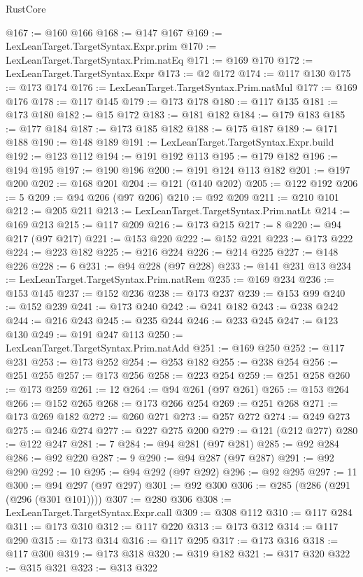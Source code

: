 \begin{lexlean}{RustCore}
\begin{coremodule}
@167 := @160 @166
@168 := @147 @167
@169 := LexLeanTarget.TargetSyntax.Expr.prim
@170 := LexLeanTarget.TargetSyntax.Prim.natEq
@171 := @169 @170
@172 := LexLeanTarget.TargetSyntax.Expr
@173 := @2 @172
@174 := @117 @130
@175 := @173 @174
@176 := LexLeanTarget.TargetSyntax.Prim.natMul
@177 := @169 @176
@178 := @117 @145
@179 := @173 @178
@180 := @117 @135
@181 := @173 @180
@182 := @15 @172
@183 := @181 @182
@184 := @179 @183
@185 := @177 @184
@187 := @173 @185 @182
@188 := @175 @187
@189 := @171 @188
@190 := @148 @189
@191 := LexLeanTarget.TargetSyntax.Expr.build
@192 := @123 @112
@194 := @191 @192 @113
@195 := @179 @182
@196 := @194 @195
@197 := @190 @196
@200 := @191 @124 @113 @182
@201 := @197 @200
@202 := @168 @201
@204 := @121 (@140 @202)
@205 := @122 @192
@206 := 5
@209 := @94 @206 (@97 @206)
@210 := @92 @209
@211 := @210 @101
@212 := @205 @211
@213 := LexLeanTarget.TargetSyntax.Prim.natLt
@214 := @169 @213
@215 := @117 @209
@216 := @173 @215
@217 := 8
@220 := @94 @217 (@97 @217)
@221 := @153 @220
@222 := @152 @221
@223 := @173 @222
@224 := @223 @182
@225 := @216 @224
@226 := @214 @225
@227 := @148 @226
@228 := 6
@231 := @94 @228 (@97 @228)
@233 := @141 @231 @13
@234 := LexLeanTarget.TargetSyntax.Prim.natRem
@235 := @169 @234
@236 := @153 @145
@237 := @152 @236
@238 := @173 @237
@239 := @153 @99
@240 := @152 @239
@241 := @173 @240
@242 := @241 @182
@243 := @238 @242
@244 := @216 @243
@245 := @235 @244
@246 := @233 @245
@247 := @123 @130
@249 := @191 @247 @113
@250 := LexLeanTarget.TargetSyntax.Prim.natAdd
@251 := @169 @250
@252 := @117 @231
@253 := @173 @252
@254 := @253 @182
@255 := @238 @254
@256 := @251 @255
@257 := @173 @256
@258 := @223 @254
@259 := @251 @258
@260 := @173 @259
@261 := 12
@264 := @94 @261 (@97 @261)
@265 := @153 @264
@266 := @152 @265
@268 := @173 @266 @254
@269 := @251 @268
@271 := @173 @269 @182
@272 := @260 @271
@273 := @257 @272
@274 := @249 @273
@275 := @246 @274
@277 := @227 @275 @200
@279 := @121 (@212 @277)
@280 := @122 @247
@281 := 7
@284 := @94 @281 (@97 @281)
@285 := @92 @284
@286 := @92 @220
@287 := 9
@290 := @94 @287 (@97 @287)
@291 := @92 @290
@292 := 10
@295 := @94 @292 (@97 @292)
@296 := @92 @295
@297 := 11
@300 := @94 @297 (@97 @297)
@301 := @92 @300
@306 := @285 (@286 (@291 (@296 (@301 @101))))
@307 := @280 @306
@308 := LexLeanTarget.TargetSyntax.Expr.call
@309 := @308 @112
@310 := @117 @284
@311 := @173 @310
@312 := @117 @220
@313 := @173 @312
@314 := @117 @290
@315 := @173 @314
@316 := @117 @295
@317 := @173 @316
@318 := @117 @300
@319 := @173 @318
@320 := @319 @182
@321 := @317 @320
@322 := @315 @321
@323 := @313 @322

\end{coremodule}
\end{lexlean}
